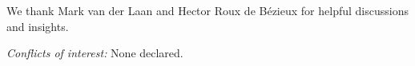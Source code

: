 We thank Mark van der Laan and Hector Roux de Bézieux for helpful discussions and insights.

\textit{Conflicts of interest:} None declared.